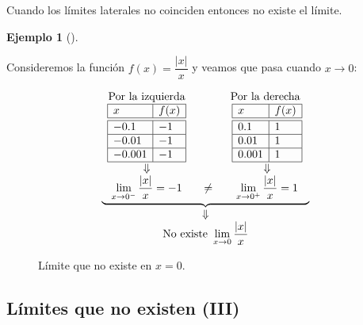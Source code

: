 \documentclass[
  a4paper,
]{scrreport}
\theoremstyle{plain}
\theoremstyle{plain}
\theoremstyle{definition}
\theoremstyle{definition}
\newtheorem{example}{Ejemplo}[chapter]
\theoremstyle{plain}
\theoremstyle{remark}
\begin{document}
Cuando los límites laterales no coinciden entonces no existe el límite.

\leavevmode{}%
\begin{example}[]\label{exm-limites-no-existen-2}

Consideremos la función \(f(x)=\dfrac{\lvert x\rvert}{x}\) y veamos que
pasa cuando \(x\to 0\):

\[\begin{array}{c}
\underbrace{\begin{array}{ccc}
\textrm{Por la izquierda} & \qquad & \textrm{Por la derecha }\\
\begin{array}{|l|l|}
\hline
x      & f(x)   \\
\hline\hline
 -0.1   & -1       \\
\hline
 -0.01   & -1     \\
\hline
 -0.001  & -1   \\
\hline
\end{array}
& &
\begin{array}{|l|l|}
\hline
x      & f(x)   \\
\hline\hline
 0.1    & 1       \\
\hline
 0.01   & 1    \\
\hline
 0.001  & 1   \\
\hline
\end{array}\\
\Downarrow & & \Downarrow\\
\displaystyle \lim_{x\to 0^-}\frac{|x|}{x}=-1
&\neq &
\displaystyle \lim_{x\to 0^+}\frac{|x|}{x}=1
\end{array}}\\
\Downarrow\\
\displaystyle \textrm{No existe }\lim_{x\to 0}\frac{|x|}{x}
\end{array}
\]

\begin{figure}

{\centering 



}

\caption{Límite que no existe en \(x=0\).}

\end{figure}

\end{example}

\hypertarget{luxedmites-que-no-existen-iii}{%
\subsection{Límites que no existen
(III)}\label{luxedmites-que-no-existen-iii}}
\end{document}
